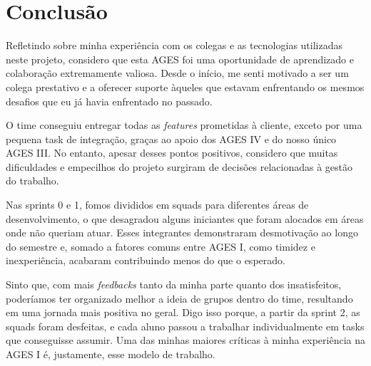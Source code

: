 \section[Conclusão]{Conclusão}


Refletindo sobre minha experiência com os colegas e as tecnologias utilizadas neste projeto, considero que esta AGES
foi uma oportunidade de aprendizado e colaboração extremamente valiosa. Desde o início, me senti motivado a ser um colega
prestativo e a oferecer suporte àqueles que estavam enfrentando os mesmos desafios que eu já havia enfrentado no passado.

O time conseguiu entregar todas as \textit{features} prometidas à cliente, exceto por uma pequena task de integração, graças
ao apoio dos AGES IV e do nosso único AGES III. No entanto, apesar desses pontos positivos, considero que muitas dificuldades
e empecilhos do projeto surgiram de decisões relacionadas à gestão do trabalho.

Nas sprints 0 e 1, fomos divididos em squads para diferentes áreas de desenvolvimento, o que desagradou alguns iniciantes que foram
alocados em áreas onde não queriam atuar. Esses integrantes demonstraram desmotivação ao longo do semestre e, somado a fatores comuns
entre AGES I, como timidez e inexperiência, acabaram contribuindo menos do que o esperado.

Sinto que, com mais \textit{feedbacks} tanto da minha parte quanto dos insatisfeitos, poderíamos ter organizado melhor a ideia de grupos dentro do
time, resultando em uma jornada mais positiva no geral. Digo isso porque, a partir da sprint 2, as squads foram desfeitas, e cada aluno
passou a trabalhar individualmente em tasks que conseguisse assumir. Uma das minhas maiores críticas à minha experiência na AGES I é,
justamente, esse modelo de trabalho.


